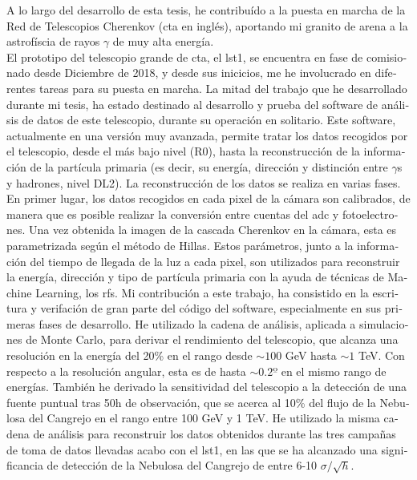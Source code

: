 \documentclass[main.tex]{subfiles}
\begin{document}
\glsresetall
\begin{otherlanguage}{spanish}

A lo largo del desarrollo de esta tesis, he contribuído a la puesta en marcha de la Red de Telescopios Cherenkov (\gls{cta} en inglés), aportando mi granito de arena a la astrofíscia de rayos $\gamma$ de muy alta energía.\\
El prototipo del telescopio grande de \gls{cta}, el \gls{lst}1, se encuentra en fase de comisionado desde Diciembre de 2018, y desde sus inicicios, me he involucrado en diferentes tareas para su puesta en marcha. La mitad del trabajo que he desarrollado durante mi tesis, ha estado destinado al desarrollo y prueba del software de análisis de datos de este telescopio, durante su operación en solitario. Este software, actualmente en una versión muy avanzada, permite tratar los datos recogidos por el telescopio, desde el más bajo nivel (R0), hasta la reconstrucción de la información de la partícula primaria (es decir, su energía, dirección y distinción entre $\gamma$s y hadrones, nivel DL2). La reconstrucción de los datos se realiza en varias fases. En primer lugar, los datos recogidos en cada pixel de la cámara son calibrados, de manera que es posible realizar la conversión entre cuentas del \gls{adc} y fotoelectrones. Una vez obtenida la imagen de la cascada Cherenkov en la cámara, esta es parametrizada según el método de Hillas. Estos parámetros, junto a la información del tiempo de llegada de la luz a cada pixel, son utilizados para reconstruir la energía, dirección y tipo de partícula primaria con la ayuda de técnicas de Machine Learning, los \glspl{rf}. Mi contribución a este trabajo, ha consistido en la escritura y verifación de gran parte del código del software, especialmente en sus primeras fases de desarrollo. He utilizado la cadena de análisis, aplicada a simulaciones de Monte Carlo, para derivar el rendimiento del telescopio, que alcanza una resolución en la energía del 20\% en el rango desde $\sim 100$ GeV hasta $\sim 1$ TeV. Con respecto a la resolución angular, esta es de hasta $\sim 0.2º$ en el mismo rango de energías. También he derivado la sensitividad del telescopio a la detección de una fuente puntual tras 50h de observación, que se acerca al 10\% del flujo de la Nebulosa del Cangrejo en el rango entre 100 GeV y 1 TeV. He utilizado la misma cadena de análisis para reconstruir los datos obtenidos durante las tres campañas de toma de datos llevadas acabo con el \gls{lst}1, en las que se ha alcanzado una significancia de detección de la Nebulosa del Cangrejo de entre 6-10 $\sigma/\sqrt{h}$.\\

\end{otherlanguage}
\end{document}
